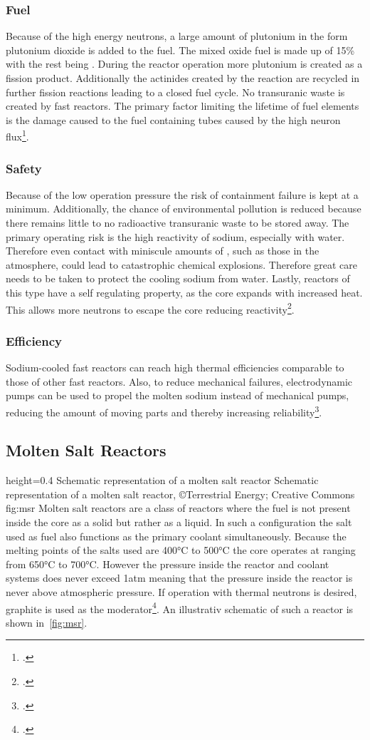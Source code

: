 \subsubsection{Fuel}
Because of the high energy neutrons, a large amount of plutonium in the form
plutonium dioxide  is added to the fuel. The mixed oxide fuel is made up of 15\% 
with the rest being . During the reactor operation more plutonium is created as a fission product.
Additionally the actinides created by the reaction are recycled in further fission reactions leading
to a closed fuel cycle. No transuranic waste is created by fast reactors. The primary
factor limiting the lifetime of fuel elements is the damage caused to the fuel containing tubes
caused by the high neuron flux\footcite[111]{T4Gen}.
\subsubsection{Safety}
Because of the low operation pressure the risk of containment failure is kept at a minimum. Additionally,
the chance of environmental pollution is reduced because there remains little to no radioactive transuranic
waste to be stored away. The primary operating risk is the high reactivity of sodium, especially with water.
Therefore even contact with miniscule amounts of , such as those in the atmosphere, could
lead to catastrophic chemical explosions. Therefore great care needs to be taken to protect the cooling
sodium from water. Lastly, reactors of this type have a self regulating
property, as the core expands with increased heat. This allows more neutrons to escape the
core reducing reactivity\footcite[30-37]{GIFAR}.
\subsubsection{Efficiency}
Sodium-cooled fast reactors can reach high thermal efficiencies comparable to those of other fast
reactors. Also, to reduce mechanical failures, electrodynamic pumps can be used to propel the
molten sodium instead of mechanical pumps, reducing the amount of moving parts and thereby increasing
reliability\footcite[30-37]{GIFAR}. 
\pagebreak
\subsection{Molten Salt Reactors}
    {height=0.4\textheight}
    {Schematic representation of a molten salt reactor}
    {Schematic representation of a molten salt reactor, ©Terrestrial Energy; Creative Commons}
    {fig:msr}
Molten salt reactors are a class of reactors where the fuel is not present inside the core as a solid
but rather as a liquid. In such a configuration the salt used as fuel also functions as the primary coolant
simultaneously. Because the melting points of the salts used are 400°C to 500°C the core operates at
ranging from 650°C to 700°C. However the pressure inside the reactor and coolant systems does never
exceed 1atm meaning that the pressure inside the reactor is never above atmospheric pressure.
If operation with thermal neutrons is desired, graphite is used as the moderator\footcite[147-152]{T4Gen}.
An illustrativ schematic of such a reactor is shown in~\ref{fig:msr}.
